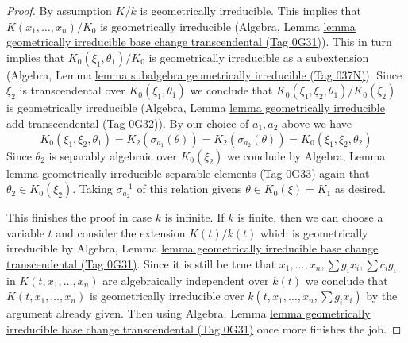 \documentclass{amsart}
\theoremstyle{plain}
\theoremstyle{definition}
\theoremstyle{remark}
\numberwithin{equation}{subsection}
\begin{document}
\begin{proof}
\medskip\noindent
By assumption $K/k$ is geometrically irreducible. This implies
that $K(x_1, \ldots, x_n)/K_0$ is geometrically irreducible
(Algebra, Lemma
\href{https://stacks.math.columbia.edu/tag/0G31}{lemma geometrically irreducible base change transcendental (Tag 0G31)}).
This in turn implies that $K_0(\xi_1, \theta_1)/K_0$
is geometrically irreducible as a subextension
(Algebra, Lemma \href{https://stacks.math.columbia.edu/tag/037N}{lemma subalgebra geometrically irreducible (Tag 037N)}).
Since $\xi_2$ is transcendental over $K_0(\xi_1, \theta_1)$
we conclude that $K_0(\xi_1, \xi_2, \theta_1)/K_0(\xi_2)$
is geometrically irreducible (Algebra, Lemma
\href{https://stacks.math.columbia.edu/tag/0G32}{lemma geometrically irreducible add transcendental (Tag 0G32)}).
By our choice of $a_1, a_2$ above we have
$$
K_0(\xi_1, \xi_2, \theta_1) =
K_2(\sigma_{a_1}(\theta)) =
K_2(\sigma_{a_2}(\theta)) =
K_0(\xi_1, \xi_2, \theta_2)
$$
Since $\theta_2$ is separably algebraic over $K_0(\xi_2)$
we conclude by Algebra, Lemma
\href{https://stacks.math.columbia.edu/tag/0G33}{lemma geometrically irreducible separable elements (Tag 0G33)} again that
$\theta_2 \in K_0(\xi_2)$. Taking $\sigma_{a_2}^{-1}$
of this relation givens $\theta \in K_0(\xi) = K_1$ as desired.

\medskip\noindent
This finishes the proof in case $k$ is infinite. If $k$ is finite,
then we can choose a variable $t$ and consider the extension
$K(t)/k(t)$ which is geometrically irreducible by
Algebra, Lemma
\href{https://stacks.math.columbia.edu/tag/0G31}{lemma geometrically irreducible base change transcendental (Tag 0G31)}.
Since it is still be true that
$x_1, \ldots, x_n, \sum g_ix_i, \sum c_ig_i$
in $K(t, x_1, \ldots, x_n)$ are algebraically independent over $k(t)$
we conclude that $K(t, x_1, \ldots, x_n)$
is geometrically irreducible over
$k(t, x_1, \ldots, x_n, \sum g_ix_i)$
by the argument already given.
Then using Algebra, Lemma
\href{https://stacks.math.columbia.edu/tag/0G31}{lemma geometrically irreducible base change transcendental (Tag 0G31)}
once more finishes the job.
\end{proof}
\end{document}
